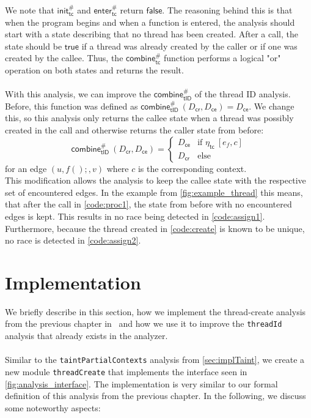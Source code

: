    \noindent We note that $\textsf{init}^{\#}_\textsf{tc}$ and $\textsf{enter}^{\#}_\textsf{tc}$ return $\textsf{false}$. The reasoning behind this is that when the program begins and when a function is entered, the analysis should start with a state describing that no thread has been created. After a call, the state should be $\textsf{true}$ if a thread was already created by the caller or if one was created by the callee. Thus, the $\textsf{combine}^{\#}_\textsf{tc}$ function performs a logical "or" operation on both states and returns the result.\\
   \\
   With this analysis, we can improve the $\textsf{combine}^{\#}_\textsf{tID}$ of the thread ID analysis. Before, this function was defined as $\textsf{combine}^{\#}_\textsf{tID}\ (D_\textsf{cr}, D_\textsf{ce}) = D_\textsf{ce}$. We change this, so this analysis only returns the callee state when a thread was possibly created in the call and otherwise returns the caller state from before:
   \[\textsf{combine}^{\#}_\textsf{tID}\ (D_\textsf{cr}, D_\textsf{ce}) = \left\{ \begin{array}{ll}
    D_\textsf{ce} & \text{if } \eta_\textsf{tc}\ [e_f,c]\\
    D_\textsf{cr} & \text{else}
    \end{array} \right.\]
   for an edge $(u, f();, v)$ where $c$ is the corresponding context.\\
   This modification allows the analysis to keep the callee state with the respective set of encountered edges. In the example from \autoref{fig:example_thread} this means, that after the call in \autoref{code:proc1}, the state from before with no encountered edges is kept. This results in no race being detected in \autoref{code:assign1}. Furthermore, because the thread created in \autoref{code:create} is known to be unique, no race is detected in \autoref{code:assign2}.

  \section{Implementation}
    We briefly describe in this section, how we implement the thread-create analysis from the previous chapter in \gob\ and how we use it to improve the \texttt{threadId} analysis that already exists in the analyzer.\\
    \\
    Similar to the \texttt{taintPartialContexts} analysis from \autoref{sec:implTaint}, we create a new module \texttt{threadCreate} that implements the interface seen in \autoref{fig:analysis_interface}. The implementation is very similar to our formal definition of this analysis from the previous chapter. In the following, we discuss some noteworthy aspects:

